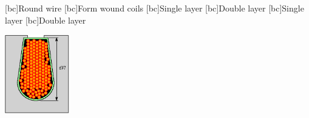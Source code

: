 \begin{psfrags}%
\psfragscanon

[bc]{{\tiny Round wire}}
[bc]{{\tiny Form wound coils}}
[bc]{{\tiny Single layer}}
[bc]{{\tiny Double layer}}
[bc]{{\tiny Single layer}}
[bc]{{\tiny Double layer}}

\includegraphics[width=0.21\textwidth]{figs/f_insulation_a.eps}
\end{psfrags}%